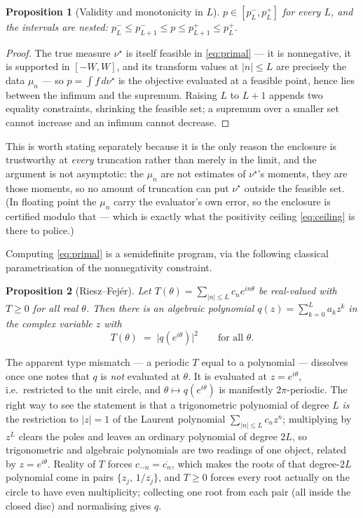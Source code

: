 \documentclass[11pt]{article}
\newtheorem{proposition}{Proposition}
\begin{document}
\begin{proposition}[Validity and monotonicity in $L$]
\label{prop:nested}
$p\in[p^-_L,p^+_L]$ for every $L$, and the intervals are nested:
$p^-_L\le p^-_{L+1}\le p\le p^+_{L+1}\le p^+_L$.
\end{proposition}
\begin{proof}
The true measure $\nu^\star$ is itself feasible in \eqref{eq:primal} --- it is nonnegative, it is
supported in $[-W,W]$, and its transform values at $|n|\le L$ are precisely the data $\mu_n$ --- so
$p=\int f\,d\nu^\star$ is the objective evaluated at a feasible point, hence lies between the
infimum and the supremum. Raising $L$ to $L+1$ appends two equality constraints, shrinking the
feasible set; a supremum over a smaller set cannot increase and an infimum cannot decrease.
\end{proof}

This is worth stating separately because it is the only reason the enclosure is trustworthy at
\emph{every} truncation rather than merely in the limit, and the argument is not asymptotic: the
$\mu_n$ are not estimates of $\nu^\star$'s moments, they are those moments, so no amount of
truncation can put $\nu^\star$ outside the feasible set. (In floating point the $\mu_n$ carry the
evaluator's own error, so the enclosure is certified modulo that --- which is exactly what the
positivity ceiling \eqref{eq:ceiling} is there to police.)

Computing \eqref{eq:primal} is a semidefinite program, via the following classical
parametrisation of the nonnegativity constraint.

\begin{proposition}[Riesz--Fej\'er]
\label{prop:rieszfejer}
Let $T(\theta)=\sum_{|n|\le L}c_ne^{in\theta}$ be real-valued with $T\ge0$ for all real $\theta$.
Then there is an \emph{algebraic} polynomial $q(z)=\sum_{k=0}^{L}a_kz^k$ in the complex variable $z$
with
\[
  T(\theta)\;=\;\big|q(e^{i\theta})\big|^2\qquad\text{for all }\theta .
\]
\end{proposition}

The apparent type mismatch --- a periodic $T$ equal to a polynomial --- dissolves once one notes that
$q$ is \emph{not} evaluated at $\theta$. It is evaluated at $z=e^{i\theta}$, i.e.\ restricted to the
unit circle, and $\theta\mapsto q(e^{i\theta})$ is manifestly $2\pi$-periodic. The right way to see
the statement is that a trigonometric polynomial of degree $L$ \emph{is} the restriction to
$|z|=1$ of the Laurent polynomial $\sum_{|n|\le L}c_nz^n$; multiplying by $z^{L}$ clears the poles
and leaves an ordinary polynomial of degree $2L$, so trigonometric and algebraic polynomials are two
readings of one object, related by $z=e^{i\theta}$. Reality of $T$ forces $c_{-n}=\overline{c_n}$,
which makes the roots of that degree-$2L$ polynomial come in pairs $\{z_j,\,1/\overline{z_j}\}$, and
$T\ge0$ forces every root actually on the circle to have even multiplicity; collecting one root from
each pair (all inside the closed disc) and normalising gives $q$.
\end{document}

